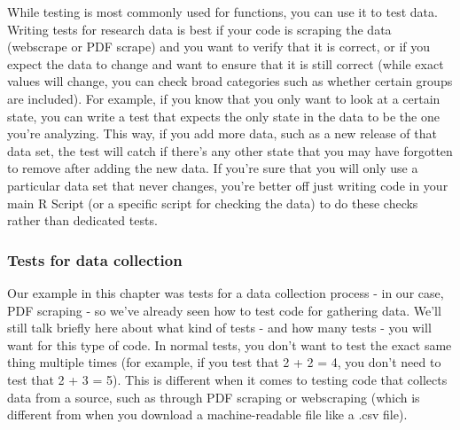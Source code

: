 \documentclass[
  12pt,
]{book}
\begin{document}
While testing is most commonly used for functions, you can use it to test data. Writing tests for research data is best if your code is scraping the data (webscrape or PDF scrape) and you want to verify that it is correct, or if you expect the data to change and want to ensure that it is still correct (while exact values will change, you can check broad categories such as whether certain groups are included). For example, if you know that you only want to look at a certain state, you can write a test that expects the only state in the data to be the one you're analyzing. This way, if you add more data, such as a new release of that data set, the test will catch if there's any other state that you may have forgotten to remove after adding the new data. If you're sure that you will only use a particular data set that never changes, you're better off just writing code in your main R Script (or a specific script for checking the data) to do these checks rather than dedicated tests.

\hypertarget{tests-for-data-collection}{%
\subsubsection{Tests for data collection}\label{tests-for-data-collection}}

Our example in this chapter was tests for a data collection process - in our case, PDF scraping - so we've already seen how to test code for gathering data. We'll still talk briefly here about what kind of tests - and how many tests - you will want for this type of code. In normal tests, you don't want to test the exact same thing multiple times (for example, if you test that 2 + 2 = 4, you don't need to test that 2 + 3 = 5). This is different when it comes to testing code that collects data from a source, such as through PDF scraping or webscraping (which is different from when you download a machine-readable file like a .csv file).
\end{document}

